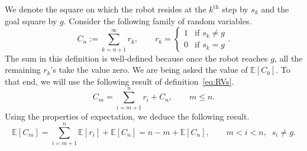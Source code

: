 We denote the square on which the robot resides at the $k^{\text{th}}$ step by
$s_k$ and the goal square by $g$. Consider the following family of random
variables.
\begin{equation}
    C_n := \sum_{k=n+1}^\infty r_k, \qquad r_k = 
\begin{cases}
    1 & \mbox{if } s_k \neq g \\
    0 & \mbox{if } s_k = g
\end{cases}.
\label{eq:RVs}
\end{equation}
The sum in this definition is well-defined because once the robot reaches $g$,
all the remaining $r_k$'s take the value zero. We are being asked the value of
$\mathbb{E}[C_0]$. To that end, we will use the following result of
definition~\eqref{eq:RVs}.
\begin{equation*} 
    C_m = \sum_{i=m+1}^n r_i + C_n, \qquad m \leq n.
\end{equation*}
Using the properties of expectation, we deduce the following result.
\begin{equation*} 
    \mathbb{E}[C_m] = \sum_{i=m+1}^n \mathbb{E}[r_i] + \mathbb{E}[C_n] = n-m + \mathbb{E}[C_n],
    \qquad m < i < n, \;\; s_i \neq g.
\end{equation*}
